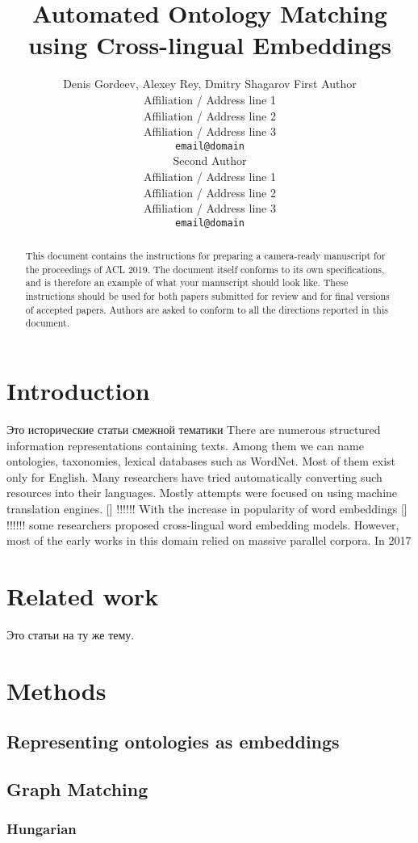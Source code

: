 \documentclass[11pt,a4paper]{article}
\title{Automated Ontology Matching using Cross-lingual Embeddings}
\author{Denis Gordeev, Alexey Rey, Dmitry Shagarov
	First Author \\
  Affiliation / Address line 1 \\
  Affiliation / Address line 2 \\
  Affiliation / Address line 3 \\
  \texttt{email@domain} \\\And
  Second Author \\
  Affiliation / Address line 1 \\
  Affiliation / Address line 2 \\
  Affiliation / Address line 3 \\
  \texttt{email@domain} \\}
\date{}
\begin{document}
\maketitle
\begin{abstract}
  This document contains the instructions for preparing a camera-ready
  manuscript for the proceedings of ACL 2019. The document itself
  conforms to its own specifications, and is therefore an example of
  what your manuscript should look like. These instructions should be
  used for both papers submitted for review and for final versions of
  accepted papers.  Authors are asked to conform to all the directions
  reported in this document.
\end{abstract}


\section{Introduction}
\foreignlanguage{russian}{Это исторические статьи смежной тематики}
There are numerous structured information representations containing texts. Among them we can name ontologies, taxonomies, lexical databases such as WordNet. Most of them exist only for English. Many researchers have tried automatically converting such resources into their languages. Mostly attempts were focused on using machine translation engines. [] !!!!!! With the increase in popularity of word embeddings [] !!!!!! some researchers proposed cross-lingual word embedding models. However, most of the early works in this domain relied on massive parallel corpora. In 2017 

\section{Related work}
\foreignlanguage{russian}{Это статьи на ту же тему.}
\section{Methods}
\subsection{Representing ontologies as embeddings}
\subsection{Graph Matching}
\subsubsection{Hungarian}
\end{document}
